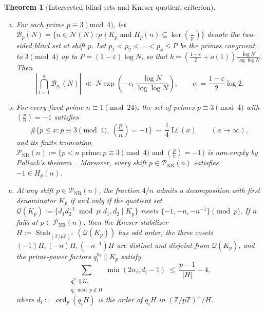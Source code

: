 \documentclass[11pt, a4paper]{article}
\theoremstyle{plain}
\newtheorem{theorem}{Theorem}[section]
\theoremstyle{definition}
\newcommand{\Z}{\mathbb{Z}}
\newcommand{\leg}[2]{\left(\frac{#1}{#2}\right)}
\begin{document}
\begin{theorem}[Intersected blind sets and Kneser quotient criterion]\label{thm:blind_intersection_and_PNR}\label{thm:unified_kneser_stabilizer_PNR}
\begin{enumerate}[(a)]
    \item For each prime $p\equiv3\pmod 4$, let $\mathcal{B}_p(N)=\{n\in\mathcal{N}(N):p\nmid K_p\text{ and }H_p(n)\subseteq\ker\leg{\cdot}{p}\}$ denote the two-sided blind set at shift $p$. Let $p_1<p_2<\dots<p_k\le P$ be the primes congruent to $3\pmod 4$ up to $P=(1-\varepsilon)\log N$, so that $k=\left(\frac{1-\varepsilon}{2}+o(1)\right)\frac{\log N}{\log\log N}$. Then
    \begin{equation}\label{eq:blind_intersection_bound}
    \left|\bigcap_{i=1}^{k}\mathcal{B}_{p_i}(N)\right|\ \ll\ N\exp\!\left(-c_1\,\frac{\log N}{\log\log N}\right),\qquad c_1=\frac{1-\varepsilon}{2}\log 2.
    \end{equation}
    \item For every fixed prime $n\equiv1\pmod{24}$, the set of primes $p\equiv3\pmod 4$ with $\leg{p}{n}=-1$ satisfies
    \[
    \#\big\{p\le x:p\equiv3\pmod 4,\ \leg{p}{n}=-1\big\}\ \sim\ \frac14\operatorname{Li}(x)\qquad(x\to\infty),
    \]
    and its finite truncation $\mathcal{P}_{\mathrm{NR}}(n):=\{p<n\text{ prime}:p\equiv3\pmod 4\text{ and }\leg{p}{n}=-1\}$ is non-empty by Pollack's theorem~\cite[Theorem~1]{PollackPrescribed4}. Moreover, every shift $p\in\mathcal{P}_{\mathrm{NR}}(n)$ satisfies $-1\in H_p(n)$.
    \item At any shift $p\in\mathcal{P}_{\mathrm{NR}}(n)$, the fraction $4/n$ admits a decomposition with first denominator $K_p$ if and only if the quotient set $\mathcal{Q}(K_p):=\{d_1 d_2^{-1}\bmod p:d_1,d_2\mid K_p\}$ meets $\{-1,-n,-n^{-1}\}\pmod p$. If $n$ fails at $p\in\mathcal{P}_{\mathrm{NR}}(n)$, then the Kneser stabilizer $H:=\operatorname{Stab}_{(\Z/p\Z)^{\times}}(\mathcal{Q}(K_p))$ has odd order, the three cosets $(-1)H,(-n)H,(-n^{-1})H$ are distinct and disjoint from $\mathcal{Q}(K_p)$, and the prime-power factors $q_i^{\alpha_i}\parallel K_p$ satisfy
    $$\sum_{\substack{q_i^{\alpha_i}\parallel K_p\\ q_i\bmod p\notin H}}\min(2\alpha_i,d_i-1)\ \le\ \frac{p-1}{|H|}-4,$$
    where $d_i:=\operatorname{ord}_p(q_i H)$ is the order of $q_i H$ in $(\Z/p\Z)^{\times}/H$.
\end{enumerate}
\end{theorem}
\end{document}
